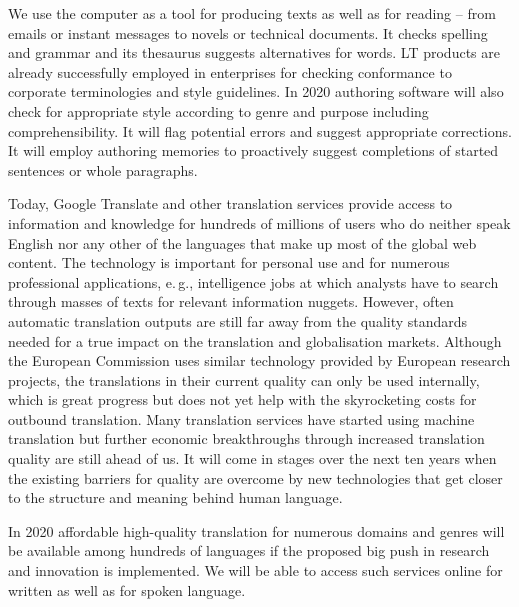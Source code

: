 \documentclass[10pt, plain]{../../metanetpaper}
\begin{document}
\begin{multicols}{2}
 
We use the computer as a tool for producing texts as well as for reading -- from emails or instant messages to novels or technical documents. It checks spelling and grammar and its thesaurus suggests alternatives for words. LT products are already successfully employed in enterprises for checking conformance to corporate terminologies and style guidelines. In 2020 authoring software will also check for appropriate style according to genre and purpose including comprehensibility. It will flag potential errors and suggest appropriate corrections. It will employ authoring memories to proactively suggest completions of started sentences or whole paragraphs.
 
Today, Google Translate and other translation services provide access to information and knowledge for hundreds of millions of users who do neither speak English nor any other of the languages that make up most of the global web content. The technology is important for personal use and for numerous professional applications, e.\,g., intelligence jobs at which analysts have to search through masses of texts for relevant information nuggets. However, often automatic translation outputs are still far away from the quality standards needed for a true impact on the translation and globalisation markets. Although the European Commission uses similar technology provided by European research projects, the translations in their current quality can only be used internally, which is great progress but does not yet help with the skyrocketing costs for outbound translation. Many translation services have started using machine translation but further economic breakthroughs through increased translation quality are still ahead of us. It will come in stages over the next ten years when the existing barriers for quality are overcome by new technologies that get closer to the structure and meaning behind human language.
 
In 2020 affordable high-quality translation for numerous domains and genres will be available among hundreds of languages if the proposed big push in research and innovation is implemented. We will be able to access such services online for written as well as for spoken language.
 

\end{multicols}
\end{document}
